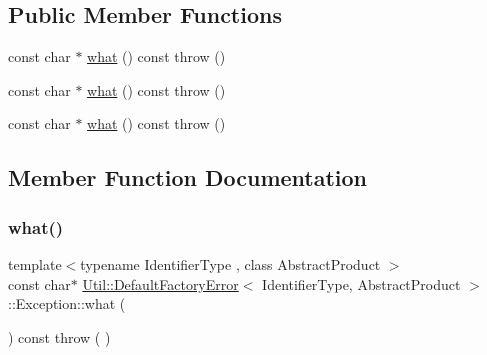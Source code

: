 \subsection*{Public Member Functions}
\begin{DoxyCompactItemize}
\item 
const char $\ast$ \mbox{\hyperlink{structUtil_1_1DefaultFactoryError_1_1Exception_a4f94d8b7f4d48002d88fe417a6659dbe}{what}} () const  throw ()
\item 
const char $\ast$ \mbox{\hyperlink{structUtil_1_1DefaultFactoryError_1_1Exception_a4f94d8b7f4d48002d88fe417a6659dbe}{what}} () const  throw ()
\item 
const char $\ast$ \mbox{\hyperlink{structUtil_1_1DefaultFactoryError_1_1Exception_a4f94d8b7f4d48002d88fe417a6659dbe}{what}} () const  throw ()
\end{DoxyCompactItemize}


\subsection{Member Function Documentation}
\mbox{\label{structUtil_1_1DefaultFactoryError_1_1Exception_a4f94d8b7f4d48002d88fe417a6659dbe}} 
\subsubsection{\texorpdfstring{what()}{what()}\hspace{0.1cm}{\footnotesize\ttfamily [1/3]}}
{\footnotesize\ttfamily template$<$typename Identifier\+Type , class Abstract\+Product $>$ \\
const char$\ast$ \mbox{\hyperlink{structUtil_1_1DefaultFactoryError}{Util\+::\+Default\+Factory\+Error}}$<$ Identifier\+Type, Abstract\+Product $>$\+::Exception\+::what (\begin{DoxyParamCaption}{ }\end{DoxyParamCaption}) const throw ( ) \hspace{0.3cm}{\ttfamily [inline]}}

\mbox{\label{structUtil_1_1DefaultFactoryError_1_1Exception_a4f94d8b7f4d48002d88fe417a6659dbe}} 
